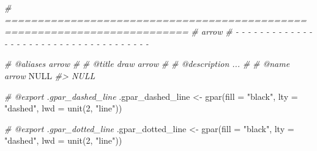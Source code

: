 \documentclass[
]{article}
\newenvironment{Shaded}{\begin{snugshade}}{\end{snugshade}}
\newcommand{\AttributeTok}[1]{\textcolor[rgb]{0.77,0.63,0.00}{#1}}
\newcommand{\CommentTok}[1]{\textcolor[rgb]{0.56,0.35,0.01}{\textit{#1}}}
\newcommand{\ConstantTok}[1]{\textcolor[rgb]{0.00,0.00,0.00}{#1}}
\newcommand{\DecValTok}[1]{\textcolor[rgb]{0.00,0.00,0.81}{#1}}
\newcommand{\FunctionTok}[1]{\textcolor[rgb]{0.00,0.00,0.00}{#1}}
\newcommand{\NormalTok}[1]{#1}
\newcommand{\OtherTok}[1]{\textcolor[rgb]{0.56,0.35,0.01}{#1}}
\newcommand{\StringTok}[1]{\textcolor[rgb]{0.31,0.60,0.02}{#1}}
\begin{document}
\begin{Shaded}
\begin{Highlighting}[]
\CommentTok{\# ==========================================================================}
\CommentTok{\# arrow}
\CommentTok{\# {-} {-} {-} {-} {-} {-} {-} {-} {-} {-} {-} {-} {-} {-} {-} {-} {-} {-} {-} {-} {-} {-} {-} {-} {-} {-} {-} {-} {-} {-} {-} {-} {-} {-} {-} {-} {-}}

\CommentTok{\#\textquotesingle{} @aliases arrow}
\CommentTok{\#\textquotesingle{}}
\CommentTok{\#\textquotesingle{} @title draw arrow}
\CommentTok{\#\textquotesingle{}}
\CommentTok{\#\textquotesingle{} @description ...}
\CommentTok{\#\textquotesingle{}}
\CommentTok{\#\textquotesingle{} @name arrow}
\ConstantTok{NULL}
\CommentTok{\#\textgreater{} NULL}

\CommentTok{\#\textquotesingle{} @export .gpar\_dashed\_line}
\NormalTok{.gpar\_dashed\_line }\OtherTok{\textless{}{-}} \FunctionTok{gpar}\NormalTok{(}\AttributeTok{fill =} \StringTok{"black"}\NormalTok{, }\AttributeTok{lty =} \StringTok{"dashed"}\NormalTok{, }\AttributeTok{lwd =} \FunctionTok{unit}\NormalTok{(}\DecValTok{2}\NormalTok{, }\StringTok{"line"}\NormalTok{))}

\CommentTok{\#\textquotesingle{} @export .gpar\_dotted\_line}
\NormalTok{.gpar\_dotted\_line }\OtherTok{\textless{}{-}} \FunctionTok{gpar}\NormalTok{(}\AttributeTok{fill =} \StringTok{"black"}\NormalTok{, }\AttributeTok{lty =} \StringTok{"dashed"}\NormalTok{, }\AttributeTok{lwd =} \FunctionTok{unit}\NormalTok{(}\DecValTok{2}\NormalTok{, }\StringTok{"line"}\NormalTok{))}


\end{Highlighting}
\end{Shaded}
\end{document}
